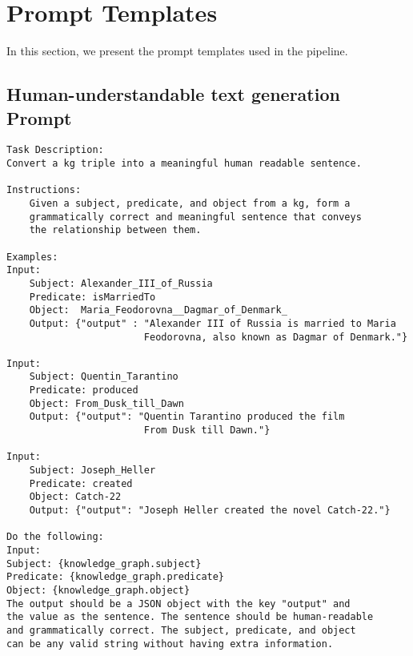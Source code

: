 \chapter{Prompt Templates}\label{ch:prompt-templates}
In this section, we present the prompt templates used in the pipeline.
\section{Human-understandable text generation Prompt}\label{sec:prompt-templates:human-understandable}
\begin{Verbatim}[fontsize=\small, frame=single, label={Prompt template for generating human-readable text}]
Task Description:
Convert a kg triple into a meaningful human readable sentence.

Instructions:
    Given a subject, predicate, and object from a kg, form a
    grammatically correct and meaningful sentence that conveys
    the relationship between them.

Examples:
Input:
    Subject: Alexander_III_of_Russia
    Predicate: isMarriedTo
    Object:  Maria_Feodorovna__Dagmar_of_Denmark_
    Output: {"output" : "Alexander III of Russia is married to Maria
                        Feodorovna, also known as Dagmar of Denmark."}

Input:
    Subject: Quentin_Tarantino
    Predicate: produced
    Object: From_Dusk_till_Dawn
    Output: {"output": "Quentin Tarantino produced the film
                        From Dusk till Dawn."}

Input:
    Subject: Joseph_Heller
    Predicate: created
    Object: Catch-22
    Output: {"output": "Joseph Heller created the novel Catch-22."}

Do the following:
Input:
Subject: {knowledge_graph.subject}
Predicate: {knowledge_graph.predicate}
Object: {knowledge_graph.object}
The output should be a JSON object with the key "output" and
the value as the sentence. The sentence should be human-readable
and grammatically correct. The subject, predicate, and object
can be any valid string without having extra information.
\end{Verbatim}

